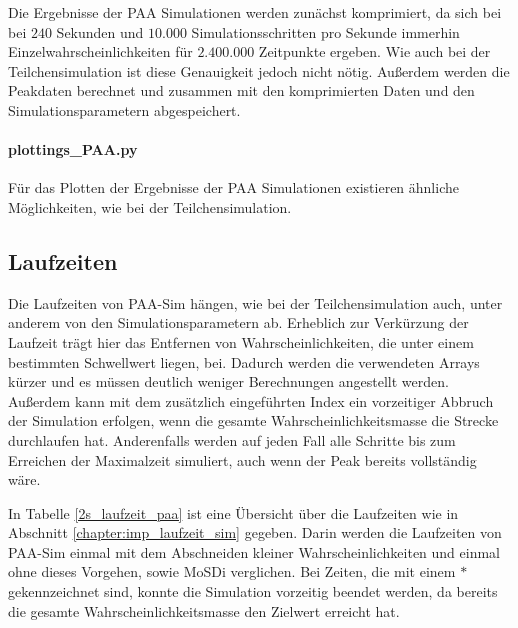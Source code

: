 Die Ergebnisse der PAA Simulationen werden zunächst komprimiert, da sich bei bei $240$ Sekunden und $10.000$ Simulationsschritten pro Sekunde immerhin Einzelwahrscheinlichkeiten für $2.400.000$ Zeitpunkte ergeben. Wie auch bei der Teilchensimulation ist diese Genauigkeit jedoch nicht nötig. 
Außerdem werden die Peakdaten berechnet und zusammen mit den komprimierten Daten und den Simulationsparametern abgespeichert.


\paragraph{plottings\_PAA.py}
Für das Plotten der Ergebnisse der PAA Simulationen existieren ähnliche Möglichkeiten, wie bei der Teilchensimulation.


\subsection{Laufzeiten}
Die Laufzeiten von PAA-Sim hängen, wie bei der Teilchensimulation auch, unter anderem von den Simulationsparametern ab. Erheblich zur Verkürzung der Laufzeit trägt hier das Entfernen von Wahrscheinlichkeiten, die unter einem bestimmten Schwellwert liegen, bei. Dadurch werden die verwendeten Arrays kürzer und es müssen deutlich weniger Berechnungen angestellt werden. Außerdem kann mit dem zusätzlich eingeführten Index ein vorzeitiger Abbruch der Simulation erfolgen, wenn die gesamte Wahrscheinlichkeitsmasse die Strecke durchlaufen hat. Anderenfalls werden auf jeden Fall alle Schritte bis zum Erreichen der Maximalzeit simuliert, auch wenn der Peak bereits vollständig wäre.

In Tabelle \ref{2s_laufzeit_paa} ist eine Übersicht über die Laufzeiten wie in Abschnitt \ref{chapter:imp_laufzeit_sim} gegeben. Darin werden die Laufzeiten von PAA-Sim einmal mit dem Abschneiden kleiner Wahrscheinlichkeiten und einmal ohne dieses Vorgehen, sowie MoSDi verglichen. Bei Zeiten, die mit einem $*$ gekennzeichnet sind, konnte die Simulation vorzeitig beendet werden, da bereits die gesamte Wahrscheinlichkeitsmasse den Zielwert erreicht hat.

